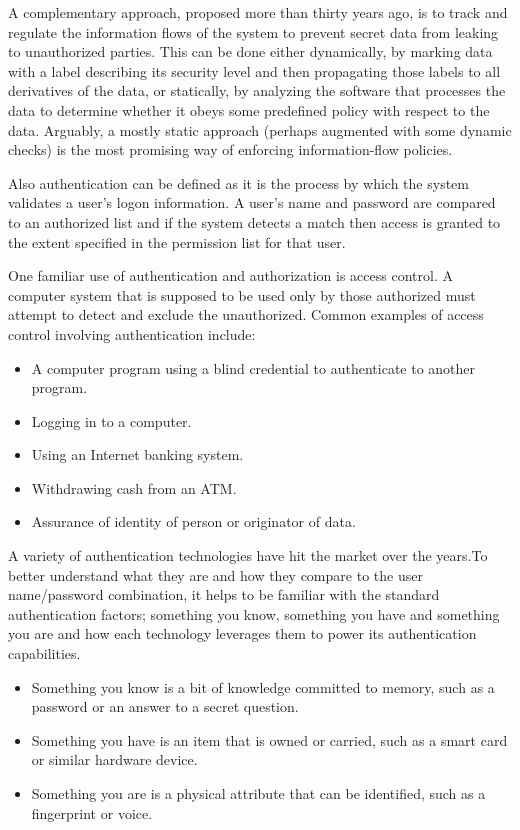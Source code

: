 A complementary approach, proposed more than thirty years ago, is to track and regulate the information flows of the system to prevent secret data from leaking to unauthorized parties. This can be done either dynamically, by marking data with a label describing its security level and then propagating those labels to all derivatives of the data, or statically, by analyzing the software that processes
the data to determine whether it obeys some predefined policy with respect to the data. Arguably, a mostly static approach (perhaps augmented with some dynamic checks) is the most promising way of enforcing information-flow policies.

Also authentication can be defined as it is the process by which the system validates a user's logon information. A user's name and password are compared to an authorized list and if the system detects a match then access is granted to the extent specified in the permission list for that user.

One familiar use of authentication and authorization is access control. A computer system that is supposed to be used only by those authorized must attempt to detect and exclude the unauthorized. Common examples of access control involving authentication include:
\begin{itemize}	
	\item A computer program using a blind credential to authenticate to another program.
	\item Logging in to a computer.	
	\item Using an Internet banking system.
	\item Withdrawing cash from an ATM.
	\item Assurance of identity of person or originator of data.
\end{itemize}

 A variety of authentication technologies have hit the market over the years.To better understand what they are and how they compare to the user name/password combination, it helps to be familiar with the standard authentication factors; something you know, something you have and something you are and how each technology leverages them to power its authentication capabilities.
 \begin{itemize}	
	\item Something you know is a bit of knowledge committed to memory, such as a password or
	 an answer to a secret question.
	\item Something you have is an item that is owned or carried, such as a smart card or similar
	 hardware device.
	\item	 Something you are is a physical attribute that can be identified, such as a fingerprint or voice.
\end{itemize}

